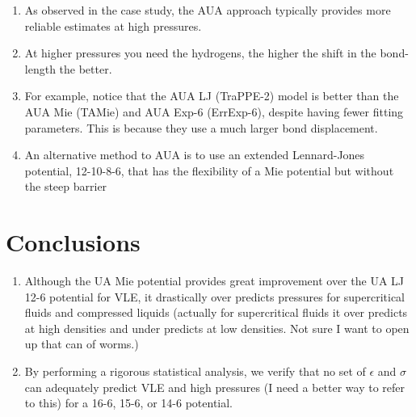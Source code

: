 \documentclass[preprint,letterpaper,floatfix,citeautoscript,aip,jcp]{revtex4-1}
\begin{document}
\begin{enumerate}
	\item As observed in the case study, the AUA approach typically provides more reliable estimates at high pressures.
	\item At higher pressures you need the hydrogens, the higher the shift in the bond-length the better.
	\item For example, notice that the AUA LJ (TraPPE-2) model is better than the AUA Mie (TAMie) and AUA Exp-6 (ErrExp-6), despite having fewer fitting parameters. This is because they use a much larger bond displacement.
	\item An alternative method to AUA is to use an extended Lennard-Jones potential, 12-10-8-6, that has the flexibility of a Mie potential but without the steep barrier
\end{enumerate}
 
\section{Conclusions}

\begin{enumerate}
	\item Although the UA Mie potential provides great improvement over the UA LJ 12-6 potential for VLE, it drastically over predicts pressures for supercritical fluids and compressed liquids (actually for supercritical fluids it over predicts at high densities and under predicts at low densities. Not sure I want to open up that can of worms.)
	\item By performing a rigorous statistical analysis, we verify that no set of $\epsilon$ and $\sigma$ can adequately predict VLE and high pressures (I need a better way to refer to this) for a 16-6, 15-6, or 14-6 potential.
\end{enumerate}


\end{document}
